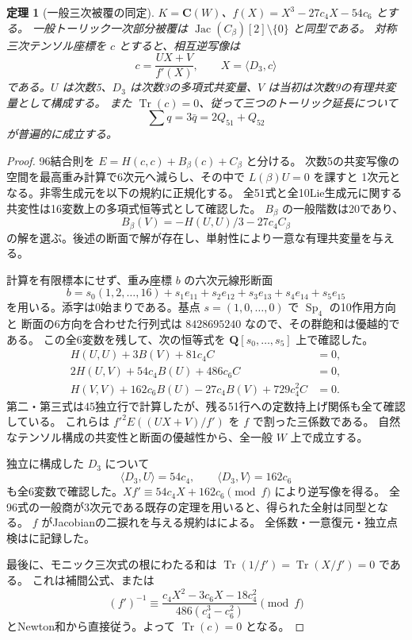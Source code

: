 \documentclass[11pt,a4paper]{ltjsarticle}
\newcommand{\CC}{\mathbf C}
\newcommand{\QQ}{\mathbf Q}
\DeclareMathOperator{\Sp}{Sp}
\newtheorem{theorem}{定理}[section]
\theoremstyle{remark}
\begin{document}
\begin{theorem}[一般三次被覆の同定]\label{thm:toric-e2}
$K=\CC(W)$、$f(X)=X^3-27c_4X-54c_6$ とする。
一般トーリック一次部分被覆は $\operatorname{Jac}(C_\beta)[2]\setminus\{0\}$ と同型である。
対称三次テンソル座標を $c$ とすると、相互逆写像は
\[
 c=\frac{UX+V}{f'(X)},\qquad X=\langle D_3,c\rangle
\]
である。$U$ は次数5、$D_3$ は次数3の多項式共変量、$V$ は当初は次数9の有理共変量として構成する。
また $\operatorname{Tr}(c)=0$、従って三つのトーリック延長について
\[
 \sum q=3\bar q=2Q_{51}+Q_{52}
\]
が普遍的に成立する。
\end{theorem}
\begin{proof}
96結合則を $E=H(c,c)+B_\beta(c)+C_\beta$ と分ける。
次数5の共変写像の空間を最高重み計算で6次元へ減らし、その中で $L(\beta)U=0$ を課すと
1次元となる。非零生成元を以下の規約に正規化する。
全51式と全10Lie生成元に関する共変性は16変数上の多項式恒等式として確認した。
$B_\beta$ の一般階数は20であり、
\[
 B_\beta(V)=-H(U,U)/3-27c_4C_\beta
\]
の解を選ぶ。後述の断面で解が存在し、単射性により一意な有理共変量を与える。

計算を有限標本にせず、重み座標 $b$ の六次元線形断面
\[
 b=s_0(1,2,\ldots,16)+s_1e_{11}+s_2e_{12}+s_3e_{13}+s_4e_{14}+s_5e_{15}
\]
を用いる。添字は0始まりである。基点 $s=(1,0,\ldots,0)$ で $\Sp_4$ の10作用方向と
断面の6方向を合わせた行列式は $8428695240$ なので、その群飽和は優越的である。
この全6変数を残して、次の恒等式を $\QQ[s_0,\ldots,s_5]$ 上で確認した。
\begin{align*}
 H(U,U)+3B(V)+81c_4C&=0,\\
 2H(U,V)+54c_4B(U)+486c_6C&=0,\\
 H(V,V)+162c_6B(U)-27c_4B(V)+729c_4^2C&=0.
\end{align*}
第二・第三式は45独立行で計算したが、残る51行への定数持上げ関係も全て確認している。
これらは $f'^2 E((UX+V)/f')$ を $f$ で割った三係数である。
自然なテンソル構成の共変性と断面の優越性から、全一般 $W$ 上で成立する。

独立に構成した $D_3$ について
\[
 \langle D_3,U\rangle=54c_4,\qquad \langle D_3,V\rangle=162c_6
\]
も全6変数で確認した。$Xf'\equiv54c_4X+162c_6\pmod f$ により逆写像を得る。
全96式の一般商が3次元である既存の定理を用いると、得られた全射は同型となる。
$f$ がJacobianの二捩れを与える規約は\cite[Theorem 2.1]{fisher-sadek-new}による。
全係数・一意復元・独立点検は\cite{toric-e2-new}に記録した。

最後に、モニック三次式の根にわたる和は
$\operatorname{Tr}(1/f')=\operatorname{Tr}(X/f')=0$ である。
これは補間公式、または
\[
 (f')^{-1}\equiv
 \frac{c_4X^2-3c_6X-18c_4^2}{486(c_4^3-c_6^2)}\pmod f
\]
とNewton和から直接従う。よって $\operatorname{Tr}(c)=0$ となる。
\end{proof}
\end{document}
